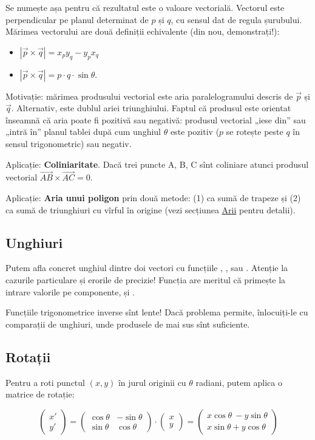 \documentclass[../main.tex]{subfiles}
\begin{document}
Se numește așa pentru că rezultatul este o valoare vectorială. Vectorul este perpendicular pe planul determinat de $p$ și $q$, cu sensul dat de regula șurubului. Mărimea vectorului are două definiții echivalente (din nou, demonstrați!):

\begin{itemize}
  \item $|\vec{p} \times \vec{q}| = x_p y_q - y_p x_q$
  \item $|\vec{p} \times \vec{q}| = p \cdot q \cdot \sin \theta$.
\end{itemize}

Motivație: mărimea produsului vectorial este aria paralelogramului descris de $\vec{p}$ și $\vec{q}$. Alternativ, este dublul ariei triunghiului. Faptul că produsul este orientat înseamnă că aria poate fi pozitivă sau negativă: produsul vectorial „iese din” sau „intră în” planul tablei după cum unghiul $\theta$ este pozitiv ($p$ se rotește peste $q$ în sensul trigonometric) sau negativ.

Aplicație: \textbf{Coliniaritate}. Dacă trei puncte A, B, C sînt coliniare atunci produsul vectorial $\vec{AB} \times \vec{AC} = 0$.

Aplicație: \textbf{Aria unui poligon} prin două metode: (1) ca sumă de trapeze și (2) ca sumă de triunghiuri cu vîrful în origine (vezi secțiunea \hyperref[sec-arii]{Arii} pentru detalii).

\subsection{Unghiuri}

Putem afla concret unghiul dintre doi vectori cu funcțiile , ,  sau . Atenție la cazurile particulare și erorile de precizie! Funcția  are meritul că primește la intrare valorile pe componente,  și .

Funcțiile trigonometrice inverse sînt lente! Dacă problema permite, înlocuiți-le cu comparații de unghiuri, unde produsele de mai sus sînt suficiente.

\subsection{Rotații}

Pentru a roti punctul $(x,y)$ în jurul originii cu $\theta$ radiani, putem aplica o matrice de rotație:

$$
\begin{pmatrix} x' \\ y' \end{pmatrix}
=
\begin{pmatrix} \cos \theta & -\sin \theta \\ \sin \theta & \cos \theta \end{pmatrix}
\cdot
\begin{pmatrix} x \\ y \end{pmatrix}
=
\begin{pmatrix} x \cos \theta\  - y \sin \theta \\ x \sin \theta + y \cos \theta \end{pmatrix}
$$
\end{document}
